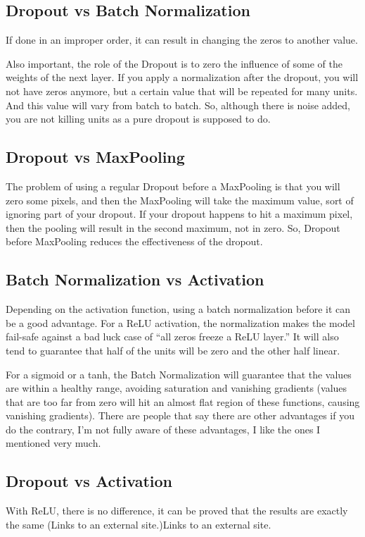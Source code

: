 	\subsection{Dropout vs Batch Normalization}
If done in an improper order, it can result in changing the zeros to another value.

Also important, the role of the Dropout is to zero the influence of some of the weights of the next layer.  If you apply a normalization after the dropout, you will not have zeros anymore, but a certain value that will be repeated for many units.  And this value will vary from batch to batch. So, although there is noise added, you are not killing units as a pure dropout is supposed to do.

	\subsection{Dropout vs MaxPooling}
The problem of using a regular Dropout before a MaxPooling is that you will zero some pixels, and then the MaxPooling will take the maximum value, sort of ignoring part of your dropout. If your dropout happens to hit a maximum pixel, then the pooling will result in the second maximum, not in zero.
So, Dropout before MaxPooling reduces the effectiveness of the dropout.

	\subsection{Batch Normalization vs Activation}
Depending on the activation function, using a batch normalization before it can be a good advantage.
For a ReLU activation, the normalization makes the model fail-safe against a bad luck case of ``all zeros freeze a ReLU layer.''  It will also tend to guarantee that half of the units will be zero and the other half linear.

For a sigmoid or a tanh, the Batch Normalization will guarantee that the values are within a healthy range, avoiding saturation and vanishing gradients (values that are too far from zero will hit an almost flat region of these functions, causing vanishing gradients).
There are people that say there are other advantages if you do the contrary, I'm not fully aware of these advantages, I like the ones I mentioned very much.

	\subsection{Dropout vs Activation}
With ReLU, there is no difference, it can be proved that the results are exactly the same (Links to an external site.)Links to an external site.

